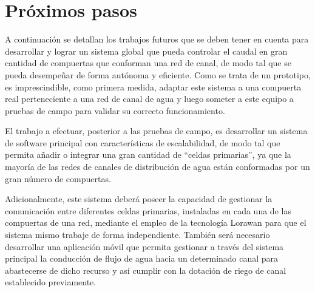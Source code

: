 \section{Próximos pasos}

A continuación se detallan los trabajos futuros que se deben tener en cuenta para desarrollar y lograr un sistema global que pueda controlar el caudal en gran cantidad de compuertas que conforman una red de canal, de modo tal que se pueda desempeñar de forma autónoma y eficiente. 
Como se trata de un prototipo, es imprescindible, como primera medida, adaptar este sistema a una compuerta real perteneciente a una red de canal de agua y luego someter a este equipo a pruebas de campo para validar su correcto funcionamiento.

El trabajo a efectuar, posterior a las pruebas de campo, es desarrollar un sistema de software principal con características de escalabilidad, de modo tal que permita añadir o integrar una gran cantidad de “celdas primarias”, ya que la mayoría de las redes de canales de distribución de agua están conformadas por un gran número de compuertas.

Adicionalmente, este sistema deberá poseer la capacidad de gestionar la comunicación entre diferentes celdas primarias, instaladas en cada una de las compuertas de una red, mediante el empleo de la tecnología Lorawan para que el sistema mismo trabaje de forma independiente. También será necesario desarrollar una aplicación móvil que permita gestionar a través del sistema principal la conducción de flujo de agua hacia un determinado canal para abastecerse de dicho recurso y así cumplir con la dotación de riego de canal establecido previamente.


